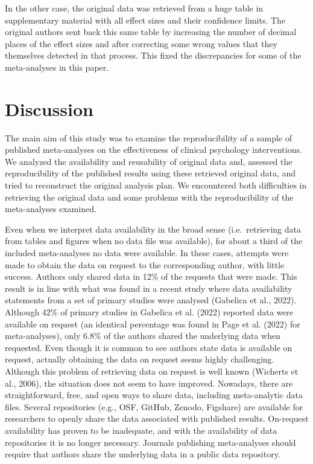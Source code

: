 \documentclass[
  ,man,floatsintext]{apa6}
\begin{document}
In the other case, the original data was retrieved from a huge table in supplementary material with all effect sizes and their confidence limits. The original authors sent back this same table by increasing the number of decimal places of the effect sizes and after correcting some wrong values that they themselves detected in that process. This fixed the discrepancies for some of the meta-analyses in this paper.

\hypertarget{discussion}{%
\section{Discussion}\label{discussion}}

The main aim of this study was to examine the reproducibility of a sample of published meta-analyses on the effectiveness of clinical psychology interventions. We analyzed the availability and reusability of original data and, assessed the reproducibility of the published results using these retrieved original data, and tried to reconstruct the original analysis plan. We encountered both difficulties in retrieving the original data and some problems with the reproducibility of the meta-analyses examined.

Even when we interpret data availability in the broad sense (i.e.~retrieving data from tables and figures when no data file was available), for about a third of the included meta-analyses no data were available. In these cases, attempts were made to obtain the data on request to the corresponding author, with little success. Authors only shared data in 12\% of the requests that were made. This result is in line with what was found in a recent study where data availability statements from a set of primary studies were analysed (Gabelica et al., 2022). Although 42\% of primary studies in Gabelica et al. (2022) reported data were available on request (an identical percentage was found in Page et al. (2022) for meta-analyses), only 6.8\% of the authors shared the underlying data when requested. Even though it is common to see authors state data is available on request, actually obtaining the data on request seems highly challenging. Although this problem of retrieving data on request is well known (Wicherts et al., 2006), the situation does not seem to have improved. Nowadays, there are straightforward, free, and open ways to share data, including meta-analytic data files. Several repositories (e.g., OSF, GitHub, Zenodo, Figshare) are available for researchers to openly share the data associated with published results. On-request availability has proven to be inadequate, and with the availability of data repositories it is no longer necessary. Journals publishing meta-analyses should require that authors share the underlying data in a public data repository.
\end{document}
